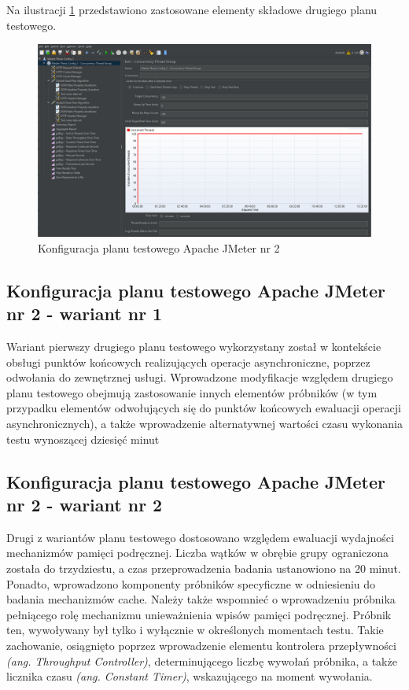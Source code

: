 Na ilustracji \ref{fig:test-plan-2} przedstawiono zastosowane elementy składowe drugiego planu testowego.

\begin{figure}[ht]
    \centering
     \includegraphics[width=\linewidth]{rys04/test-plan-2.png}
    \caption{Konfiguracja planu testowego Apache JMeter nr 2}
    \label{fig:test-plan-2}
\end{figure}

\subsection*{Konfiguracja planu testowego Apache JMeter nr 2 - wariant nr 1}
\label{plan-testowy-2-wariant-1}
Wariant pierwszy drugiego planu testowego wykorzystany został w kontekście obsługi punktów końcowych realizujących operacje asynchroniczne, poprzez odwołania do zewnętrznej usługi. Wprowadzone modyfikacje względem drugiego planu testowego obejmują zastosowanie innych elementów próbników (w tym przypadku elementów odwołujących się do punktów końcowych ewaluacji operacji asynchronicznych), a także wprowadzenie alternatywnej wartości czasu wykonania testu wynoszącej dziesięć minut

\subsection*{Konfiguracja planu testowego Apache JMeter nr 2 - wariant nr 2}
\label{plan-testowy-2-wariant-2}
Drugi z wariantów planu testowego dostosowano względem ewaluacji wydajności mechanizmów pamięci podręcznej. Liczba wątków w obrębie grupy ograniczona została do trzydziestu, a czas przeprowadzenia badania ustanowiono na 20 minut. Ponadto, wprowadzono komponenty próbników specyficzne w odniesieniu do badania mechanizmów cache. Należy także wspomnieć o wprowadzeniu próbnika pełniącego rolę mechanizmu unieważnienia wpisów pamięci podręcznej. Próbnik ten, wywoływany był tylko i wyłącznie w określonych momentach testu. Takie zachowanie, osiągnięto poprzez wprowadzenie elementu kontrolera przepływności \textit{(ang. Throughput Controller)}, determinującego liczbę wywołań próbnika, a także licznika czasu \textit{(ang. Constant Timer)}, wskazującego na moment wywołania. 